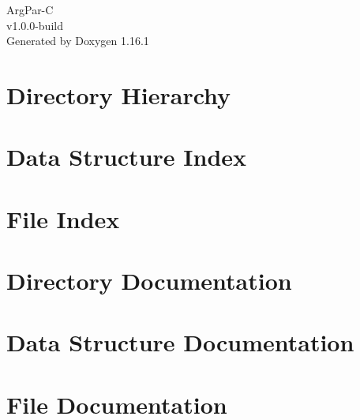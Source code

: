 \documentclass[twoside]{book}
\newcommand{\+}{\discretionary{\mbox{\scriptsize$\hookleftarrow$}}{}{}}
\newcommand{\clearemptydoublepage}{%
    \newpage{\pagestyle{empty}\cleardoublepage}%
  }
\begin{document}
  \raggedbottom
    \hypersetup{pageanchor=false,
                bookmarksnumbered=true,
                pdfencoding=unicode
               }
  \begin{titlepage}
  \vspace*{7cm}
  \begin{center}%
  {\Large Arg\+Par-\/C}\\
  [1ex]\large v1.\+0.\+0-\/build \\
  \vspace*{1cm}
  {\large Generated by Doxygen 1.16.1}\\
  \end{center}
  \end{titlepage}
  \clearemptydoublepage
  \tableofcontents
  \clearemptydoublepage
  \hypersetup{pageanchor=true}

\chapter{Directory Hierarchy}

\chapter{Data Structure Index}

\chapter{File Index}

\chapter{Directory Documentation}





\chapter{Data Structure Documentation}



\chapter{File Documentation}











  \backmatter
  \newpage
  \clearemptydoublepage
  \printindex
\end{document}
